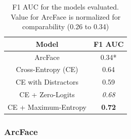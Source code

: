 \begin{table}[]
    \centering
    \begin{tabular}{|c|c|}
        \hline
        Model & F1 \ac{AUC} \\
        \hline
        ArcFace & 0.34* \\
        \hline
        Cross-Entropy (CE) & 0.64 \\
        \hline
        CE with Distractors & 0.59 \\
        \hline
        CE + Zero-Logits & \emph{0.68} \\
        \hline
        CE + Maximum-Entropy & \textbf{0.72} \\
        \hline
    \end{tabular}
    \caption{F1 AUC for the models evaluated. Value for ArcFace is normalized for comparability (0.26 to 0.34)}
    \label{tab:frf1auc}
\end{table}

\subsubsection{ArcFace}


